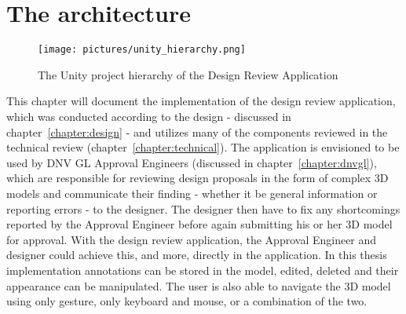 % 
% 
% 


\section{The architecture}
\begin{figure}%
	\texttt{[image: pictures/unity\_hierarchy.png]} %
	\caption[The Unity project hierarchy of the Design Review Application]{The Unity project hierarchy of the Design Review Application}
	\label{fig:unity_hierarchy}
\end{figure} 

This chapter will document the implementation of the design review application, which was conducted according to the design - discussed in chapter~\ref{chapter:design} - 
and utilizes many of the components reviewed in the technical review (chapter~\ref{chapter:technical}). The application is envisioned to be used by DNV GL Approval Engineers 
(discussed in chapter~\ref{chapter:dnvgl}), which are responsible for reviewing design proposals in the form of complex 3D models and communicate their finding - whether it 
be general information or reporting errors - to the designer. The designer then have to fix any shortcomings reported by the Approval Engineer before again submitting 
his or her 3D model for approval. With the design review application, the Approval Engineer and designer could achieve this, and more, directly in the application.
In this thesis implementation annotations can be stored in the model, edited, deleted and their appearance can be manipulated. The user is also able to navigate the 
3D model using only gesture, only keyboard and mouse, or a combination of the two.

